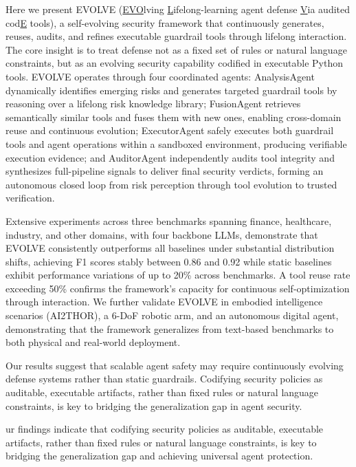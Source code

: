 Here we present EVOLVE (\underline{EVO}lving \underline{L}ifelong-learning agent defense \underline{V}ia audited cod\underline{E} tools), a self-evolving security framework that continuously generates, reuses, audits, and refines executable guardrail tools through lifelong interaction. The core insight is to treat defense not as a fixed set of rules or natural language constraints, but as an evolving security capability codified in executable Python tools. EVOLVE operates through four coordinated agents: AnalysisAgent dynamically identifies emerging risks and generates targeted guardrail tools by reasoning over a lifelong risk knowledge library; FusionAgent retrieves semantically similar tools and fuses them with new ones, enabling cross-domain reuse and continuous evolution; ExecutorAgent safely executes both guardrail tools and agent operations within a sandboxed environment, producing verifiable execution evidence; and AuditorAgent independently audits tool integrity and synthesizes full-pipeline signals to deliver final security verdicts, forming an autonomous closed loop from risk perception through tool evolution to trusted verification.

Extensive experiments across three benchmarks spanning finance, healthcare, industry, and other domains, with four backbone LLMs, demonstrate that EVOLVE consistently outperforms all baselines under substantial distribution shifts, achieving F1 scores stably between 0.86 and 0.92 while static baselines exhibit performance variations of up to 20\% across benchmarks. A tool reuse rate exceeding 50\% confirms the framework's capacity for continuous self-optimization through interaction. We further validate EVOLVE in embodied intelligence scenarios (AI2THOR), a 6-DoF robotic arm, and an autonomous digital agent, demonstrating that the framework generalizes from text-based benchmarks to both physical and real-world deployment.

Our results suggest that scalable agent safety may require continuously evolving defense systems rather than static guardrails. Codifying security policies as auditable, executable artifacts, rather than fixed rules or natural language constraints, is key to bridging the generalization gap in agent security.


ur findings indicate that codifying security policies as auditable, executable artifacts, rather than fixed rules or natural language constraints, is key to bridging the generalization gap and achieving universal agent protection.
